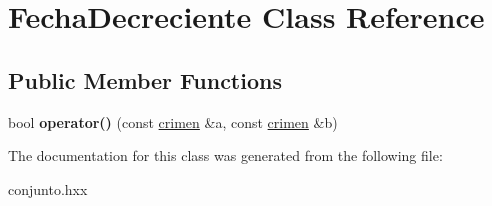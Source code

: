 \hypertarget{classFechaDecreciente}{}\section{Fecha\+Decreciente Class Reference}
\label{classFechaDecreciente}
\subsection*{Public Member Functions}
\begin{DoxyCompactItemize}
\item 
\hypertarget{classFechaDecreciente_accc7b9a1ffe43de612f5c49d53b7ea5c}{}bool {\bfseries operator()} (const \hyperlink{classcrimen}{crimen} \&a, const \hyperlink{classcrimen}{crimen} \&b)\label{classFechaDecreciente_accc7b9a1ffe43de612f5c49d53b7ea5c}

\end{DoxyCompactItemize}


The documentation for this class was generated from the following file\+:\begin{DoxyCompactItemize}
\item 
conjunto.\+hxx\end{DoxyCompactItemize}
